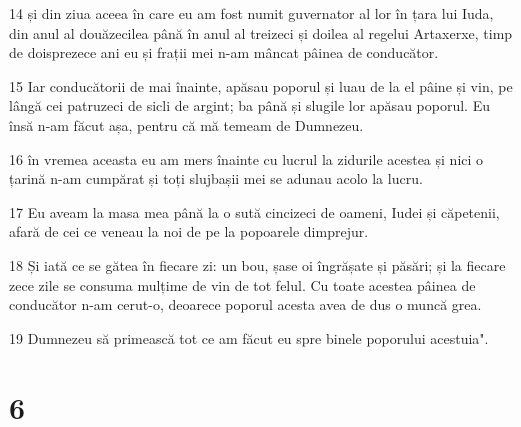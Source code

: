 \par 14 și din ziua aceea în care eu am fost numit guvernator al lor în țara lui Iuda, din anul al douăzecilea până în anul al treizeci și doilea al regelui Artaxerxe, timp de doisprezece ani eu și frații mei n-am mâncat pâinea de conducător.
\par 15 Iar conducătorii de mai înainte, apăsau poporul și luau de la el pâine și vin, pe lângă cei patruzeci de sicli de argint; ba până și slugile lor apăsau poporul. Eu însă n-am făcut așa, pentru că mă temeam de Dumnezeu.
\par 16 în vremea aceasta eu am mers înainte cu lucrul la zidurile acestea și nici o țarină n-am cumpărat și toți slujbașii mei se adunau acolo la lucru.
\par 17 Eu aveam la masa mea până la o sută cincizeci de oameni, Iudei și căpetenii, afară de cei ce veneau la noi de pe la popoarele dimprejur.
\par 18 Și iată ce se gătea în fiecare zi: un bou, șase oi îngrășate și păsări; și la fiecare zece zile se consuma mulțime de vin de tot felul. Cu toate acestea pâinea de conducător n-am cerut-o, deoarece poporul acesta avea de dus o muncă grea.
\par 19 Dumnezeu să primească tot ce am făcut eu spre binele poporului acestuia".

\chapter{6}

